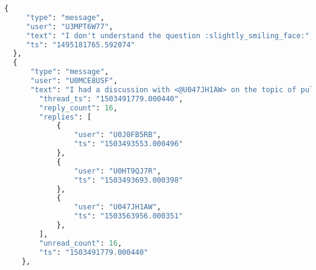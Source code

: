 \clearpage %
\begin{lstlisting}[caption={JSON sample of Slack logs},label={lst:json},language=Python,basicstyle=\tiny]
 {
     "type": "message",
     "user": "U3MPT6W77",
     "text": "I don't understand the question :slightly_smiling_face:",
     "ts": "1495181765.592074"
  },
  {
      "type": "message",
      "user": "U0MCE8USF",
      "text": "I had a discussion with <@U047JH1AW> on the topic of pulling through 'Multiple language support in Web client'. The suggestion is to create a separate story for 'cache key' for MVP3. <@U03V1DDPM> does this sound ok for you?",
        "thread_ts": "1503491779.000440",
        "reply_count": 16,
        "replies": [
            {
                "user": "U0J0FB5RB",
                "ts": "1503493553.000496"
            },
            {
                "user": "U0HT9QJ7R",
                "ts": "1503493693.000398"
            },
            {
                "user": "U047JH1AW",
                "ts": "1503563956.000351"
            },
        ],
        "unread_count": 16,
        "ts": "1503491779.000440"
    },
\end{lstlisting}
